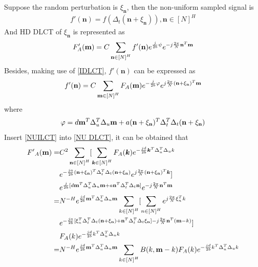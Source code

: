 \documentclass[journal]{IEEEtran}
\begin{document}
Suppose the random perturbation is $ {\xi _{\boldsymbol n}} $, then the non-uniform sampled signal is 
\begin{align}
	 f'(\boldsymbol n) = f({\Delta _t}({\boldsymbol{n}} + {\xi _{\boldsymbol n}})),\boldsymbol n \in {[N]^H} 
\end{align}
And HD DLCT of $ {\xi _{\boldsymbol n}} $ is represented as
\begin{align}
	{F'_A}({\bf{m}}) = C\sum\limits_{{\bf{n}} \in {{[N]}^H}} {f'({\bf{n}}){e^{\frac{j}{{2b}}\psi }}{e^{ - j\frac{{2\pi }}{N}{{\bf{n}}^T}{\bf{m}}}}} 
	\label{NU DLCT}
\end{align}
Besides, making use of \eqref{IDLCT}, $ f'(\boldsymbol n) $ can be expressed as
\begin{align}
	f'({\bf{n}}) = C\sum\limits_{{\bf{m}} \in {{[N]}^H}} {{F_A}({\bf{m}}){e^{ - \frac{j}{{2b}}\varphi }}{e^{j\frac{{2\pi }}{N}{{({\bf{n}} + {\xi _{\bf{n}}})}^T}{\bf{m}}}}}
	\label{NUILCT} 
\end{align}
where
\begin{align}
	\varphi  = d{{\bf{m}}^T}\Delta _u^T{\Delta _u}{\bf{m}} + a{({\bf{n}} + {\xi _{\bf{n}}})^T}\Delta _t^T{\Delta _t}({\bf{n}} + {\xi _{\bf{n}}})
	\label{varphi}
\end{align}
Insert \eqref{NUILCT} into \eqref{NU DLCT}, it can be obtained that 
\begin{align}
		{{F'}_A}({\bf{m}}) =& C^2\sum\limits_{{\bf{n}} \in {{[N]}^H}} [\sum\limits_{\boldsymbol k \in {{[N]}^H}}    
		                 {F_A}(\boldsymbol k) e^{ - \frac{jd}{{2b}}{\boldsymbol k^T}\Delta _u^T{\Delta _u}k} \notag\\
						 &e^{ - \frac{ja}{{2b}}{{({\bf{n}} + {\xi _{\bf{n}}})}^T}\Delta _t^T{\Delta _t}({\bf{n}} + {\xi _{\bf{n}}})} {e^{j\frac{{2\pi }}{N}{{({\bf{n}} + {\xi _{\bf{n}}})}^T}\boldsymbol k}}]\notag\\
					 &{e^{\frac{j}{{2b}}[{d{{\bf{m}}^T}\Delta _u^T{\Delta _u}{\bf{m}} + a{{\bf{n}}^T}\Delta _t^T{\Delta _t}{\bf{n}}}]}}
					 {e^{ - j\frac{{2\pi }}{N}{{\bf{n}}^T}{\bf{m}}}}\notag\\
		= & {N^{ - H}} {e^{\frac{{jd}}{{2b}}{{\bf{m}}^T}\Delta _u^T{\Delta _u}{\bf{m}}}} \sum\limits_{k \in {{[N]}^H}} [\sum\limits_{n \in {{[N]}^H}} e^{ j\frac{{2\pi }}{N}\xi _n^Tk }\notag\\
		& e^{ - \frac{{ja}}{{2b}} [\xi _n^T\Delta _t^T{\Delta _t}({\bf{n}}+ {\xi _{\bf{n}}})
		 +{{\bf{n}}^T}\Delta _t^T{\Delta _t}{\xi _{\bf{n}}}] - j\frac{{2\pi }}{N} {{\bf{n}}^T}({\bf{m}} - k)} ]\notag\\
	   & {F_A}(k){e^{ - \frac{{jd}}{{2b}}{k^T}\Delta _u^T{\Delta _u}k}}\notag\\
	 = & {N^{ - H}}{e^{\frac{{jd}}{{2b}}{{\bf{m}}^T}\Delta _u^T{\Delta _u}{\bf{m}}}}\sum\limits_{k \in {{[N]}^H}} {B(k,{\bf{m}} - k){F_A}(k){e^{ - \frac{{jd}}{{2b}}{k^T}\Delta _u^T{\Delta _u}k}}} 
\end{align}
\end{document}
